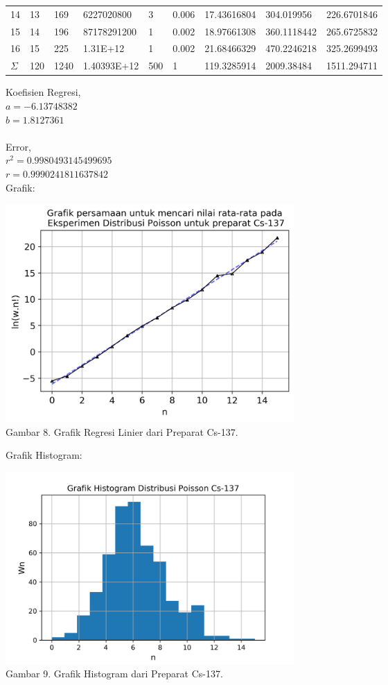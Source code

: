 \documentclass{article}
\begin{document}
\begin{longtable}{@{}lllllllll@{}}
				14  & 13  & 169                  & 6227020800  & 3   & 0.006 & 17.43616804  & 304.019956                  & 226.6701846  \\
				15  & 14  & 196                  & 87178291200 & 1   & 0.002 & 18.97661308  & 360.1118442                 & 265.6725832  \\
				16  & 15  & 225                  & 1.31E+12    & 1   & 0.002 & 21.68466329  & 470.2246218                 & 325.2699493  \\* \midrule
				$\Sigma$ & 120 & 1240                 & 1.40393E+12 & 500 & 1     & 119.3285914  & 2009.38484                  & 1511.294711  \\* \bottomrule
			\end{longtable}
			\hspace{-0.6cm}Koefisien Regresi, \\
			$a = -6.13748382$ \\
			$b = 1.8127361$ \\ \\
			Error,\\
			$r^{2} = 0.9980493145499695$ \\
			$r = 0.9990241811637842$ \\ \newpage
			Grafik: 
			\begin{center}
				\includegraphics[width=110mm]{Data/Cs-137-Graph.png}\\
				Gambar 8. Grafik Regresi Linier dari Preparat Cs-137.
			\end{center}
			Grafik Histogram:
			\begin{center}
				\includegraphics[width=110mm]{Data/Cs-137.png}\\
				Gambar 9. Grafik Histogram dari Preparat Cs-137.
			\end{center} 
\end{document}
